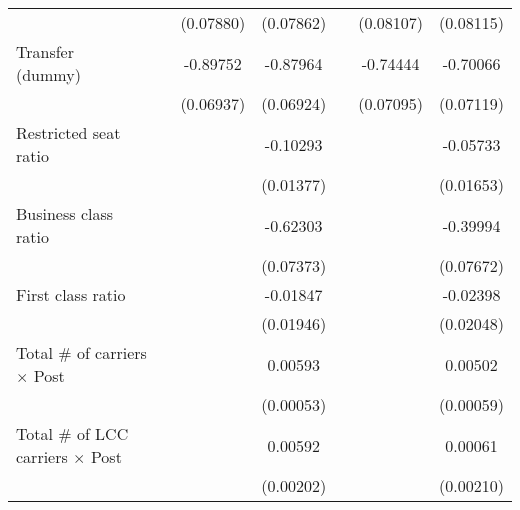 \begin{table}[htbp]
\begin{tabular}{l*{6}{c}}
                    &                     &   (0.07880)         &   (0.07862)         &                     &   (0.08107)         &   (0.08115)         \\
\addlinespace
\shortstack{Transfer \\ (dummy)}&                     &    -0.89752\sym{***}&    -0.87964\sym{***}&                     &    -0.74444\sym{***}&    -0.70066\sym{***}\\
                    &                     &   (0.06937)         &   (0.06924)         &                     &   (0.07095)         &   (0.07119)         \\
\addlinespace
Restricted seat ratio&                     &                     &    -0.10293\sym{***}&                     &                     &    -0.05733\sym{***}\\
                    &                     &                     &   (0.01377)         &                     &                     &   (0.01653)         \\
\addlinespace
Business class ratio&                     &                     &    -0.62303\sym{***}&                     &                     &    -0.39994\sym{***}\\
                    &                     &                     &   (0.07373)         &                     &                     &   (0.07672)         \\
\addlinespace
First class ratio   &                     &                     &    -0.01847         &                     &                     &    -0.02398         \\
                    &                     &                     &   (0.01946)         &                     &                     &   (0.02048)         \\
\addlinespace
Total # of carriers $\times$ Post&                     &                     &     0.00593\sym{***}&                     &                     &     0.00502\sym{***}\\
                    &                     &                     &   (0.00053)         &                     &                     &   (0.00059)         \\
\addlinespace
Total # of LCC carriers $\times$ Post&                     &                     &     0.00592\sym{***}&                     &                     &     0.00061         \\
                    &                     &                     &   (0.00202)         &                     &                     &   (0.00210)         \\

\end{tabular}
\end{table}
